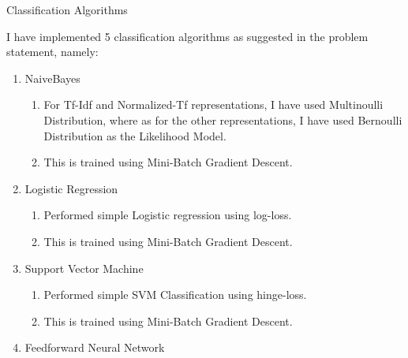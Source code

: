 \documentclass{article}
\begin{document}
\begin{qsection}{Classification Algorithms}

	I have implemented 5 classification  algorithms  as  suggested	in	the  problem
	statement, namely:

	\begin{enumerate}
		\item NaiveBayes

			\begin{enumerate}
				\item For  Tf-Idf  and  Normalized-Tf   representations,	 I	 have	used Multinoulli Distribution, where as for the other representations,  I have  used	Bernoulli	Distribution   as  the	 Likelihood   Model.

				\item This	is	  trained	 using	  Mini-Batch	Gradient	Descent.
			\end{enumerate}

		\item Logistic Regression

			\begin{enumerate}
				\item Performed simple Logistic regression using log-loss.

				\item This	is	  trained	 using	  Mini-Batch	Gradient	Descent.
			\end{enumerate}

		\item Support Vector Machine

			\begin{enumerate}
				\item Performed	 simple    SVM	  Classification	using	 hinge-loss.

				\item This	is	  trained	 using	  Mini-Batch	Gradient	Descent.
			\end{enumerate}

		\item Feedforward Neural Network



\end{enumerate}
\end{qsection}
\end{document}
